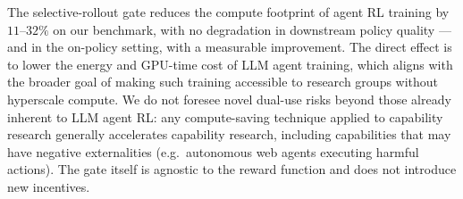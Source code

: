 \documentclass{article}
\begin{document}
The selective-rollout gate reduces the compute footprint of agent RL
training by $11$--$32\%$ on our benchmark, with no degradation in
downstream policy quality — and in the on-policy setting, with a
measurable improvement. The direct effect is to lower the energy and
GPU-time cost of LLM agent training, which aligns with the broader
goal of making such training accessible to research groups without
hyperscale compute. We do not foresee novel dual-use risks beyond
those already inherent to LLM agent RL: any compute-saving technique
applied to capability research generally accelerates capability
research, including capabilities that may have negative externalities
(e.g.\ autonomous web agents executing harmful actions). The gate
itself is agnostic to the reward function and does not introduce new
incentives.


\newpage

\end{document}
